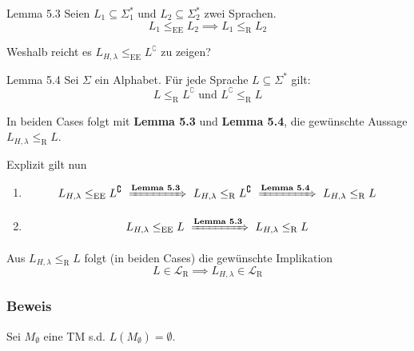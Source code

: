 \documentclass[a4paper, 11pt]{article}
\def\Lr{\mathcal{L}_\text{R}}
\begin{document}
                        \begin{mainbox}{Lemma 5.3}
                            Seien $L_1 \subseteq \Sigma_{1}^*$ und $L_2 \subseteq \Sigma_{2}^*$ zwei Sprachen.
                            $$L_1 \leq_{\text{EE}} L_2 \implies L_1 \leq_{\text{R}} L_2$$
                        \end{mainbox}
                    
                        Weshalb reicht es $L_{H, \lambda} \leq_{\text{EE}} L^\complement$ zu zeigen?
                    
                        
                        \begin{mainbox}{Lemma 5.4}
                            Sei $\Sigma$ ein Alphabet. Für jede Sprache $L \subseteq \Sigma^*$ gilt:
                         $$L \leq_\text{R} L^\complement \text{ und } L^\complement \leq_\text{R} L$$
                        \end{mainbox}
                    
                        In beiden Cases folgt mit \textbf{Lemma 5.3} und \textbf{Lemma 5.4}, die gewünschte Aussage $L_{H, \lambda} \leq_{\text{R}} L$.
                    
                        Explizit gilt nun
                    
                        \begin{enumerate}[label=\arabic*.]
                            \item $$L_{H, \lambda} \leq_{\text{EE}} L^\complement \ \xRightarrow{\textbf{Lemma 5.3}} \ L_{H,\lambda} \leq_{\text{R}} L^\complement \ \xRightarrow{\textbf{Lemma 5.4}} \ L_{H,\lambda} \leq_{\text{R}} L$$
                            \item $$L_{H, \lambda} \leq_{\text{EE}} L \ \xRightarrow{\textbf{Lemma 5.3}} \ L_{H,\lambda} \leq_{\text{R}} L$$
                        \end{enumerate}
                    
                        
                        Aus $L_{H,\lambda} \leq_{\text{R}} L$ folgt (in beiden Cases) die gewünschte Implikation  
                        $$L \in \Lr \implies L_{H, \lambda} \in \Lr$$
                    
                    
                    
                        \subsubsection{Beweis}
                        Sei $M_{\emptyset}$ eine TM s.d. $L(M_{\emptyset}) = \emptyset$. 
                    
\end{document}

